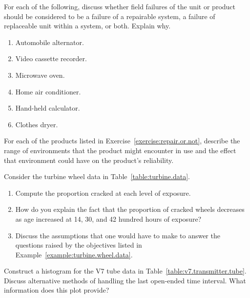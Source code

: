 \begin{exercise}
\label{exercise:repair.or.not}
For each of the following, discuss whether field failures of the unit
or product should be considered to be a failure of a repairable
system, a failure of replaceable unit within a system, or both.
Explain why.
\begin{enumerate}
\item
Automobile alternator.
\item
Video cassette recorder.
\item
Microwave oven.
\item
Home air conditioner.
\item
Hand-held calculator.
\item
Clothes dryer.
\end{enumerate}
\end{exercise}


\begin{exercise}
For each of the products listed in
Exercise~\ref{exercise:repair.or.not}, describe the range of
environments that the product might encounter in use and the effect
that environment could have on the product's reliability.
\end{exercise}

\begin{exercise}
Consider the turbine wheel data in 
Table~\ref{table:turbine.data}.
\begin{enumerate}
\item
Compute the proportion cracked at each level of exposure.
\item
How do you explain the fact that the
proportion of cracked wheels decreases as age increased at 14, 30, and 42 
hundred hours of exposure?
\item
Discuss the assumptions that one would have to make to answer the
questions 
raised by the objectives listed in 
Example~\ref{example:turbine.wheel.data}.
\end{enumerate}
\end{exercise}

\begin{exercise}
Construct a histogram for the V7 tube data in
Table~\ref{table:v7.transmitter.tube}. Discuss alternative methods of
handling the last open-ended time interval. What information does this
plot provide?
\end{exercise}


